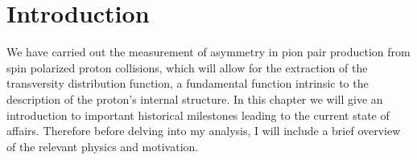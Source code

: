 \documentclass[abstract = on,listof=totoc, bibliography=totoc]{scrreprt}
\begin{document}



\chapter{Introduction}

We have carried out the measurement of asymmetry in pion pair production from spin polarized proton collisions, which will allow for the extraction of the transversity distribution function, a fundamental function intrinsic to the description of the proton's internal structure. In this chapter we will give an introduction to important historical milestones leading to the current state of affairs. Therefore before delving into my analysis, I will include a brief overview of the relevant physics and motivation. 
\end{document}
